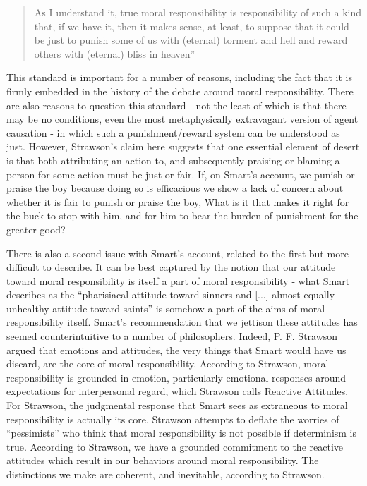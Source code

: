 \documentclass[phd,12pt,oneside,paper=letterpaper]{ubcthesis}
\begin{document}
\begin{quote}
As I understand it, true moral responsibility is responsibility of such a kind that, if we have it, then it makes sense, at least, to suppose that it could be just to punish some of us with (eternal) torment and hell and reward others with (eternal) bliss in heaven'' \citep[p.216]{strawsong2010}
\end{quote}

This standard is important for a number of reasons, including the fact that it is firmly embedded in the history of the debate around moral responsibility. There are also reasons to question this standard - not the least of which is that there may be no conditions, even the most metaphysically extravagant version of agent causation - in which such a punishment/reward system can be understood as just. However, Strawson's claim here suggests that one essential element of desert is that both attributing an action to, and subsequently praising or blaming a person for some action must be just or fair. If, on Smart's account, we punish or praise the boy because doing so is efficacious we show a lack of concern about whether it is fair to punish or praise the boy, What is it that makes it right for the buck to stop with him, and for him to bear the burden of punishment for the greater good? 

There is also a second issue with Smart's account, related to the first but more difficult to describe. It can be best captured by the notion that our attitude toward moral responsibility is itself a part of moral responsibility - what Smart describes as the ``pharisiacal attitude toward sinners and [...] almost equally unhealthy attitude toward saints'' is somehow a part of the aims of moral responsibility itself. Smart's recommendation that we jettison these attitudes has seemed counterintuitive to a number of philosophers. Indeed, P. F. Strawson \citep{strawsonp1974} argued that emotions and attitudes, the very things that Smart would have us discard, are the core of moral responsibility. According to Strawson, moral responsibility is grounded in emotion, particularly emotional responses around expectations for interpersonal regard, which Strawson calls Reactive Attitudes. For Strawson, the judgmental response that Smart sees as extraneous to moral responsibility is actually its core.  Strawson attempts to deflate the worries of ``pessimists'' who think that moral responsibility is not possible if determinism is true. According to Strawson, we have a grounded commitment to the reactive attitudes which result in our behaviors around moral responsibility. The distinctions we make are coherent, and inevitable, according to Strawson.
\end{document}
